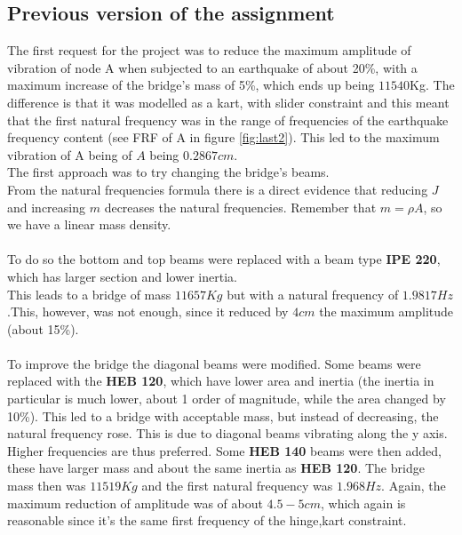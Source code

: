 \documentclass[10pt,a4paper,final]{report}
\begin{document}
\subsection{Previous version of the assignment}
The first request for the project was to reduce the maximum amplitude of vibration of node A when subjected to an earthquake of about 20\%, with a maximum increase of the bridge's mass of 5\%, which ends up being $11540$Kg. The difference is that it was modelled as a kart, with slider constraint and this meant that the first natural frequency was in the range of frequencies of the earthquake frequency content (see FRF of A in figure \ref{fig:last2}). This led to the maximum vibration of A being of $A$ being $0.2867cm$.\\
The first approach was to try changing the bridge's beams.\\
From the natural frequencies formula there is a direct evidence that reducing $J$ and increasing $m$ decreases the natural frequencies. Remember that $m=\rho A$, so we have a linear mass density.\\ \\
To do so the bottom and top beams were replaced with a beam type \textbf{IPE 220}, which has larger section and lower inertia.
\\
This leads to a bridge of mass $11657Kg$ but with a natural frequency of $1.9817Hz$.This, however, was not enough, since it reduced by $4cm$ the maximum amplitude (about 15\%).
\\ \\
To improve the bridge the diagonal beams were modified. Some beams were replaced with the \textbf{HEB 120}, which have lower area and inertia (the inertia in particular is much lower, about 1 order of magnitude, while the area changed by 10\%). This led to a bridge with acceptable mass, but instead of 
decreasing, the natural frequency rose. This is due to diagonal beams vibrating along the y axis. Higher frequencies are thus preferred. Some \textbf{HEB 140}  beams were then added, these have larger mass and about the same inertia as \textbf{HEB 120}.  The bridge mass then was $11519Kg$ and the first natural frequency was $1.968Hz$. Again, the maximum reduction of amplitude was of about $4.5-5cm$, which again is reasonable since it's the same first frequency of the hinge,kart constraint.
\end{document}

